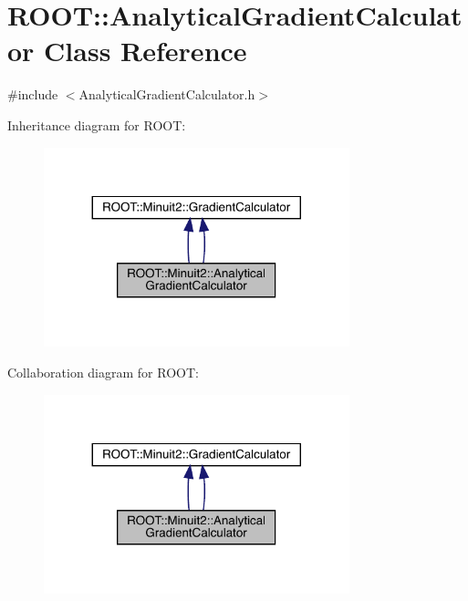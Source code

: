 \hypertarget{classROOT_1_1Minuit2_1_1AnalyticalGradientCalculator}{}\section{R\+O\+OT\+:\+:Analytical\+Gradient\+Calculator Class Reference}
\label{classROOT_1_1Minuit2_1_1AnalyticalGradientCalculator}


{\ttfamily \#include $<$Analytical\+Gradient\+Calculator.\+h$>$}



Inheritance diagram for R\+O\+OT\+:\nopagebreak
\begin{figure}[H]
\begin{center}
\leavevmode
\includegraphics[width=251pt]{d3/de4/classROOT_1_1Minuit2_1_1AnalyticalGradientCalculator__inherit__graph}
\end{center}
\end{figure}


Collaboration diagram for R\+O\+OT\+:\nopagebreak
\begin{figure}[H]
\begin{center}
\leavevmode
\includegraphics[width=251pt]{dd/dfa/classROOT_1_1Minuit2_1_1AnalyticalGradientCalculator__coll__graph}
\end{center}
\end{figure}
